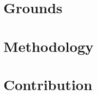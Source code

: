 \documentclass{Dissertate}
\begin{document}

\frontmatter
\setstretch{\dnormalspacing}


\setcounter{chapter}{0}  %
\part{Grounds}





\part{Methodology}







\part{Contribution}








%
% 
% 
% 

\setstretch{\dnormalspacing}

\backmatter

% 
% 

% 
\end{document}
